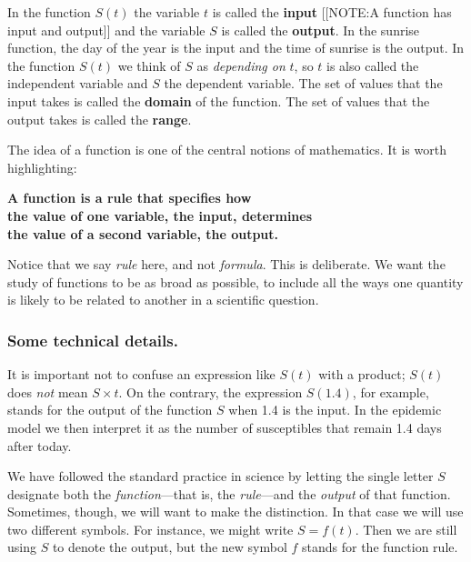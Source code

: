 In the function $S(t)$ the variable $t$ is called the {\bf
  input}
[[NOTE:A function has input and output]]
and the variable $S$ is called the {\bf output}. In the
sunrise function, the day of the year is the input and the time of
sunrise is the output.  In the function $S(t)$ we think of $S$ as {\em
  depending on\/} $t$, so $t$ is also called the independent variable
and $S$ the dependent variable.  The set of values that the input
takes is called the {\bf domain} of the function.  The
set of values that the output takes is called the {\bf
  range}.

The idea of a function is one of the central notions of mathematics.
It is worth highlighting:
\begin{observation}
\bf A function is a rule that 
			specifies how \\
\bf the value of one variable, the input, 
			determines \\
\bf the value of a second variable, the output.
\end{observation}
Notice that we say {\em rule\/} here, and not {\em formula}.  This is
deliberate.  We want the study of functions to be as broad as
possible, to include all the ways one quantity is likely to be related
to another in a scientific question.




\subsubsection{Some technical details.}
It is important not to confuse an
expression like $S(t)$ with a product; $S(t)$ does {\em not\/} mean $S
\times t$.  On the contrary, the expression $S(1.4)$, for example,
stands for the output of the function $S$ when 1.4 is the input.  In
the epidemic model we then interpret it as the number of susceptibles
that remain 1.4 days after today.

We have followed the standard practice in science by letting the
single letter $S$ designate both the {\em function\/}---that is, the
{\em rule\/}---and the {\em output\/} of that function.  Sometimes,
though, we will want to make the distinction.  In that case we will
use two different symbols.  For instance, we might write $S = f(t)$.
Then we are still using $S$ to denote the output, but the new symbol
$f$ stands for the function rule.

